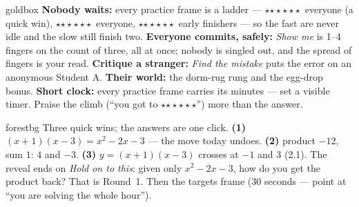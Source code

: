 \documentclass[10pt]{article}
\newcommand{\rung}[1]{{\color{goldacc}\ifcase#1\or$\star$\or$\star\star$\or$\star\star\star$\fi}}
\begin{document}
\begin{skillbox}{goldbox}
\textbf{Nobody waits:} every practice frame is a ladder --- \rung1\ everyone (a quick win),
\rung2\ everyone, \rung3\ early finishers --- so the fast are never idle and the slow still
finish two. \textbf{Everyone commits, safely:} \emph{Show me} is 1--4 fingers on the count of
three, all at once; nobody is singled out, and the spread of fingers is your read.
\textbf{Critique a stranger:} \emph{Find the mistake} puts the error on an anonymous Student A.
\textbf{Their world:} the dorm-rug rung and the egg-drop bonus. \textbf{Short clock:} every
practice frame carries its minutes --- set a visible timer. Praise the climb (``you got to
\rung2'') more than the answer.
\end{skillbox}

\begin{skillbox}{forestbg}
Three quick wins; the answers are one click. \textbf{(1)} $(x+1)(x-3)=x^2-2x-3$ --- the move
today undoes. \textbf{(2)} product $-12$, sum $1$: $4$ and $-3$. \textbf{(3)} $y=(x+1)(x-3)$
crosses at $-1$ and $3$ (2.1). The reveal ends on \emph{Hold on to this}: given only
$x^2-2x-3$, how do you get the product back? That is Round~1. Then the targets frame (30
seconds --- point at ``you are solving the whole hour'').
\end{skillbox}
\end{document}
